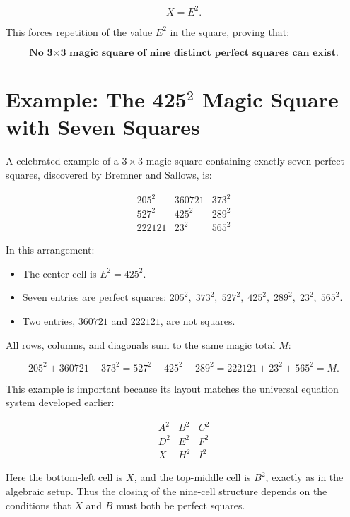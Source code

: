 \documentclass[12pt]{article}
\begin{document}
\[
X = E^2.
\]



This forces repetition of the value $E^2$ in the square, proving that:



\[
\textbf{No 3$\times$3 magic square of nine distinct perfect squares can exist.}
\]

\section*{Example: The 425$^2$ Magic Square with Seven Squares}

A celebrated example of a $3\times 3$ magic square containing exactly seven
perfect squares, discovered by Bremner and Sallows, is:



\[
\begin{matrix}
205^2   & 360721 & 373^2 \\
527^2   & 425^2  & 289^2 \\
222121  & 23^2   & 565^2
\end{matrix}
\]



In this arrangement:

\begin{itemize}
  \item The center cell is $E^2 = 425^2$.
  \item Seven entries are perfect squares:
        $205^2,\; 373^2,\; 527^2,\; 425^2,\; 289^2,\; 23^2,\; 565^2$.
  \item Two entries, $360721$ and $222121$, are not squares.
\end{itemize}

All rows, columns, and diagonals sum to the same magic total $M$:


\[
205^2 + 360721 + 373^2
= 527^2 + 425^2 + 289^2
= 222121 + 23^2 + 565^2
= M.
\]



This example is important because its layout matches the universal
equation system developed earlier:



\[
\begin{matrix}
A^2 & B^2 & C^2 \\
D^2 & E^2 & F^2 \\
X   & H^2 & I^2
\end{matrix}
\]



Here the bottom-left cell is $X$, and the top-middle cell is $B^2$,
exactly as in the algebraic setup.  
Thus the closing of the nine-cell structure depends on the conditions
that $X$ and $B$ must both be perfect squares.
\end{document}
